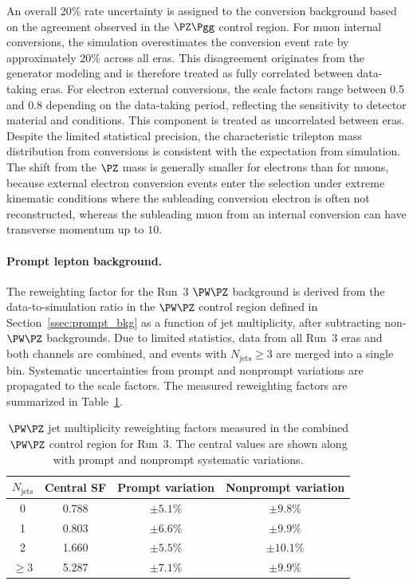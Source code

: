 An overall 20\% rate uncertainty is assigned to the conversion background based on the agreement observed in the $\PZ\Pgg$ control region. For muon internal conversions, the simulation overestimates the conversion event rate by approximately 20\% across all eras. This disagreement originates from the generator modeling and is therefore treated as fully correlated between data-taking eras. For electron external conversions, the scale factors range between 0.5 and 0.8 depending on the data-taking period, reflecting the sensitivity to detector material and conditions. This component is treated as uncorrelated between eras. Despite the limited statistical precision, the characteristic trilepton mass distribution from conversions is consistent with the expectation from simulation. The shift from the $\PZ$ mass is generally smaller for electrons than for muons, because external electron conversion events enter the selection under extreme kinematic conditions where the subleading conversion electron is often not reconstructed, whereas the subleading muon from an internal conversion can have transverse momentum up to $10$\GeV.

\paragraph{Prompt lepton background.}
The reweighting factor for the Run~3 $\PW\PZ$ background is derived from the data-to-simulation ratio in the $\PW\PZ$ control region defined in Section~\ref{ssec:prompt_bkg} as a function of jet multiplicity, after subtracting non-$\PW\PZ$ backgrounds. Due to limited statistics, data from all Run~3 eras and both channels are combined, and events with $N_{\text{jets}} \geq 3$ are merged into a single bin. Systematic uncertainties from prompt and nonprompt variations are propagated to the scale factors. The measured reweighting factors are summarized in Table~\ref{tab:wz_njet_sf}.

\begin{table}[htbp]
  \centering
  \begin{tabular}{cccc}
    \hline
    $N_{\text{jets}}$ & Central SF & Prompt variation & Nonprompt variation \\
    \hline
    0        & 0.788 & $\pm 5.1\%$ & $\pm 9.8\%$ \\
    1        & 0.803 & $\pm 6.6\%$ & $\pm 9.9\%$ \\
    2        & 1.660 & $\pm 5.5\%$ & $\pm 10.1\%$ \\
    $\geq 3$ & 5.287 & $\pm 7.1\%$ & $\pm 9.9\%$ \\
    \hline
  \end{tabular}
  \caption{$\PW\PZ$ jet multiplicity reweighting factors measured in the combined $\PW\PZ$ control region for Run~3. The central values are shown along with prompt and nonprompt systematic variations.}
  \label{tab:wz_njet_sf}
\end{table}

